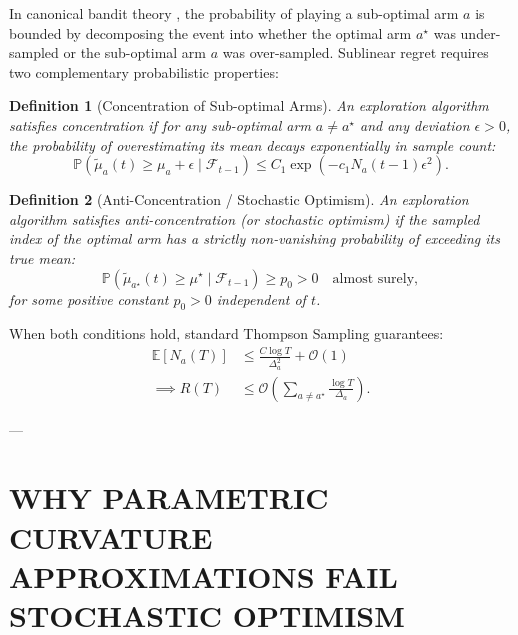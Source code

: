 \documentclass[twoside]{article}
\newtheorem{definition}{Definition}
\begin{document}
In canonical bandit theory \citep{agrawal2012analysis, agrawal2013further, russo2014information}, the probability of playing a sub-optimal arm $a$ is bounded by decomposing the event into whether the optimal arm $a^\star$ was under-sampled or the sub-optimal arm $a$ was over-sampled. Sublinear regret requires two complementary probabilistic properties:

\begin{definition}[Concentration of Sub-optimal Arms]
An exploration algorithm satisfies concentration if for any sub-optimal arm $a \ne a^\star$ and any deviation $\epsilon > 0$, the probability of overestimating its mean decays exponentially in sample count:
\begin{equation}
\mathbb{P}\left(\tilde{\mu}_a(t) \ge \mu_a + \epsilon \mid \mathcal{F}_{t-1}\right) \le C_1 \exp\left( - c_1 N_a(t-1) \epsilon^2 \right).
\label{eq:concentration}
\end{equation}
\end{definition}

\begin{definition}[Anti-Concentration / Stochastic Optimism]
An exploration algorithm satisfies anti-concentration (or stochastic optimism) if the sampled index of the optimal arm has a strictly non-vanishing probability of exceeding its true mean:
\begin{equation}
\mathbb{P}\left(\tilde{\mu}_{a^\star}(t) \ge \mu^\star \mid \mathcal{F}_{t-1}\right) \ge p_0 > 0 \quad \text{almost surely},
\label{eq:anti_concentration}
\end{equation}
for some positive constant $p_0 > 0$ independent of $t$.
\end{definition}

When both conditions hold, standard Thompson Sampling guarantees:
\begin{equation}
\begin{aligned}
\mathbb{E}[N_a(T)] &\le \frac{C \log T}{\Delta_a^2} + \mathcal{O}(1) \\
\implies R(T) &\le \mathcal{O}\left( \sum_{a \ne a^\star} \frac{\log T}{\Delta_a} \right).
\end{aligned}
\end{equation}

---

\section{WHY PARAMETRIC CURVATURE APPROXIMATIONS FAIL STOCHASTIC OPTIMISM}
\label{sec:laplace_failure}
\end{document}
